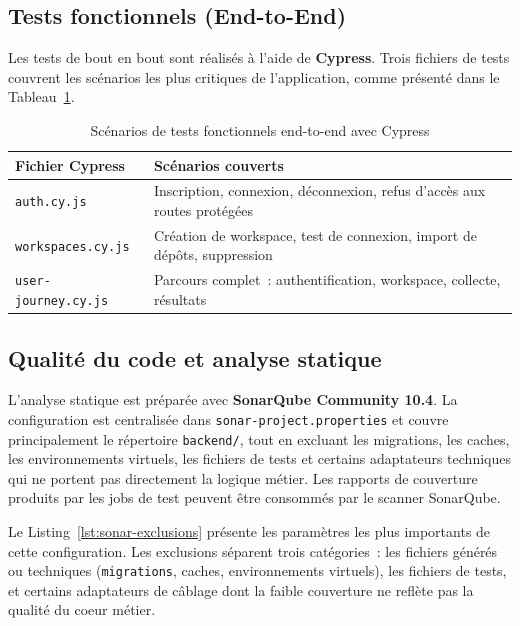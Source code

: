\subsection{Tests fonctionnels (End-to-End)}

Les tests de bout en bout sont réalisés à l'aide de \textbf{Cypress}. Trois fichiers de tests
couvrent les scénarios les plus critiques de l'application, comme présenté dans le
Tableau~\ref{tab:tests-cypress}.

\begin{table}[H]
\centering
\small
\caption{Scénarios de tests fonctionnels end-to-end avec Cypress}
\label{tab:tests-cypress}
\begin{tabular}{|>{\raggedright\arraybackslash}p{4cm}
                |>{\raggedright\arraybackslash}p{9cm}|}
\hline
\textbf{Fichier Cypress} & \textbf{Scénarios couverts} \\
\hline
\texttt{auth.cy.js} & Inscription, connexion, déconnexion, refus d'accès aux routes protégées \\
\hline
\texttt{workspaces.cy.js} & Création de workspace, test de connexion, import de dépôts, suppression \\
\hline
\texttt{user-journey.cy.js} & Parcours complet~: authentification, workspace, collecte, résultats \\
\hline
\end{tabular}
\end{table}

\subsection{Qualité du code et analyse statique}

L'analyse statique est préparée avec \textbf{SonarQube Community 10.4}. La configuration est
centralisée dans \texttt{sonar-project.properties} et couvre principalement le répertoire
\texttt{backend/}, tout en excluant les migrations, les caches, les environnements virtuels, les
fichiers de tests et certains adaptateurs techniques qui ne portent pas directement la logique
métier. Les rapports de couverture produits par les jobs de test peuvent être consommés par le
scanner SonarQube.

Le Listing~\ref{lst:sonar-exclusions} présente les paramètres les plus importants de cette
configuration. Les exclusions séparent trois catégories~: les fichiers générés ou techniques
(\texttt{migrations}, caches, environnements virtuels), les fichiers de tests, et certains
adaptateurs de câblage dont la faible couverture ne reflète pas la qualité du coeur métier.


